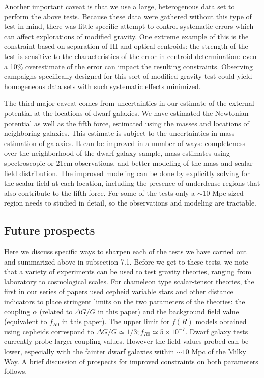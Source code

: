 \documentclass[useAMS,usenatbib,twocolumn]{mn2e}
\begin{document}
Another important caveat is that we use a large, heterogenous data set to
perform the above tests.  Because these data were gathered without this
type of test in mind, there was little specific attempt to control
systematic errors which can affect explorations of modified gravity.
One extreme example of this is the constraint based on separation of
HI and optical centroids: the strength of the test is sensitive to the
 characteristics of the error in centroid determination: even a
10\% overestimate of the error can impact the
resulting constraints.  Observing campaigns specifically designed for this
sort of modified gravity test could yield homogeneous data sets with such
systematic effects minimized.

The third major caveat comes from uncertainties in our estimate of the 
external potential at the locations of dwarf galaxies. We have estimated the 
Newtonian potential as well as the fifth force, estimated using the masses 
and locations of neighboring galaxies. This estimate is subject to the 
uncertainties in mass estimation of galaxies. It can be improved in a number of 
ways: completeness over the neighborhood of the dwarf galaxy
sample, mass estimates using spectroscopic or 21cm observations, and better modeling of the mass and scalar field distribution. The improved modeling 
can be done by explicitly solving for the scalar field at each location, including the 
presence of underdense regions that also contribute to the fifth force. For some
of the tests only a $\sim 10$ Mpc sized region needs to studied in detail, so 
the observations and modeling are tractable. 

\subsection{Future prospects}
Here we discuss specific ways to sharpen each of the tests we have carried out and summarized above in subsection 7.1. Before we get to these tests, we note that a variety of experiments can be used to test gravity theories, ranging from laboratory to cosmological scales. For chameleon type scalar-tensor theories, the first in our series of papers \citet{cepheid} used cepheid variable stars and other distance indicators to place stringent limits on the two parameters of the theories: the coupling $\alpha$ (related to $\Delta G/G$ in this paper) and the background field value (equivalent to $f_{R0}$ in this paper).  The upper limit for $f(R)$ models obtained using cepheids correspond to $\Delta G/G\simeq 1/3; f_{R0}\simeq 5\times10^{-7}$. Dwarf galaxy tests currently probe larger coupling values. However the field values probed can be lower, especially with the fainter dwarf galaxies within $\sim 10$ Mpc of the Milky Way. 
A brief discussion of prospects for improved constraints on both parameters follows. 
\end{document}
